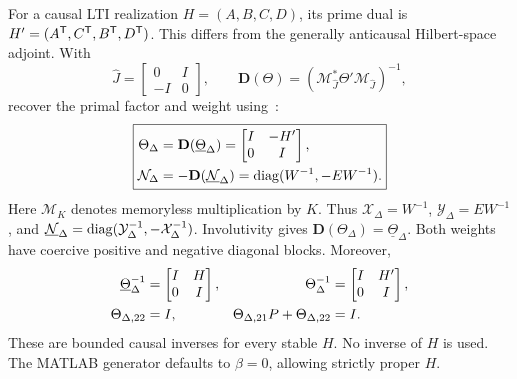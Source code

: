 For a causal LTI realization $H=(A,B,C,D)$, its prime dual is $H'=(A^{\mathsf{T}},C^{\mathsf{T}},B^{\mathsf{T}},D^{\mathsf{T}})$. This differs from the generally anticausal Hilbert-space adjoint. With
\begin{equation*}
 \hat J=\begin{bmatrix}0&I\\-I&0\end{bmatrix},\qquad
 \mathbf D(\Theta)=(\mathcal M_{\hat J}^*\Theta'\mathcal M_{\hat J})^{-1},
\end{equation*}
recover the primal factor and weight using~\cite[Definition 7 and Theorem 3]{dualPIE}:
\begin{equation}\label{eq:recoveredprimal}
 \boxed{\begin{aligned}
 \Theta_\Delta&=\mathbf D(\underline\Theta_\Delta)
 =\begin{bmatrix}I&-H'\\0&I\end{bmatrix},\\
 \mathcal N_\Delta&=-\mathbf D(\underline{\mathcal N}_\Delta)
 =\operatorname{diag}(W^{-1},-EW^{-1}).
 \end{aligned}}
\end{equation}
Here $\mathcal M_K$ denotes memoryless multiplication by $K$. Thus $\mathcal X_\Delta=W^{-1}$, $\mathcal Y_\Delta=EW^{-1}$, and $\underline{\mathcal N}_\Delta=\operatorname{diag}(\mathcal Y_\Delta^{-1},-\mathcal X_\Delta^{-1})$. Involutivity gives $\mathbf D(\Theta_\Delta)=\underline\Theta_\Delta$. Both weights have coercive positive and negative diagonal blocks. Moreover,
\begin{align}
 \underline\Theta_\Delta^{-1}&=\begin{bmatrix}I&H\\0&I\end{bmatrix},&
 \Theta_\Delta^{-1}&=\begin{bmatrix}I&H'\\0&I\end{bmatrix},\notag\\
 \Theta_{\Delta,22}&=I,&
 \Theta_{\Delta,21}P+\Theta_{\Delta,22}&=I.
\end{align}
These are bounded causal inverses for every stable $H$. No inverse of $H$ is used. The MATLAB generator defaults to $\beta=0$, allowing strictly proper $H$.


